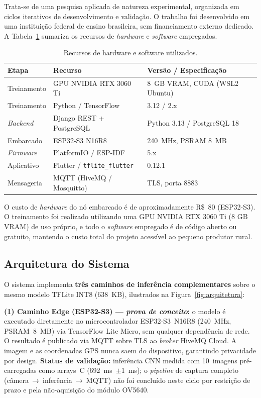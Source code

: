 \documentclass[12pt]{article}
\begin{document}
Trata-se de uma pesquisa aplicada de natureza experimental, organizada em ciclos
iterativos de desenvolvimento e validação. O trabalho foi desenvolvido em uma instituição federal de ensino brasileira, sem financiamento externo dedicado. A Tabela~\ref{tab:recursos}
sumariza os recursos de \textit{hardware} e \textit{software} empregados.

\begin{table}[ht]
\centering
\caption{Recursos de hardware e software utilizados.}
\label{tab:recursos}
\begin{tabular}{@{}lll@{}}
\toprule
\textbf{Etapa} & \textbf{Recurso} & \textbf{Versão / Especificação} \\
\midrule
Treinamento  & GPU NVIDIA RTX 3060 Ti           & 8~GB VRAM, CUDA (WSL2 Ubuntu) \\
Treinamento  & Python / TensorFlow              & 3.12 / 2.x \\
\textit{Backend} & Django REST + PostgreSQL      & Python 3.13 / PostgreSQL 18 \\
Embarcado    & ESP32-S3 N16R8                   & 240~MHz, PSRAM 8~MB \\
\textit{Firmware} & PlatformIO / ESP-IDF         & 5.x \\
Aplicativo   & Flutter / \texttt{tflite\_flutter} & 0.12.1 \\
Mensageria   & MQTT (HiveMQ / Mosquitto)        & TLS, porta 8883 \\
\bottomrule
\end{tabular}
\end{table}

O custo de \textit{hardware} do nó embarcado é de aproximadamente R\$~80 (ESP32-S3).
O treinamento foi realizado utilizando uma GPU NVIDIA RTX 3060 Ti (8 GB VRAM) de uso próprio, e todo o \textit{software}
empregado é de código aberto ou gratuito, mantendo o custo total do projeto acessível
ao pequeno produtor rural.

\subsection{Arquitetura do Sistema}

O sistema implementa \textbf{três caminhos de inferência complementares} sobre o
mesmo modelo TFLite INT8 (638~KB), ilustrados na Figura~\ref{fig:arquitetura}:

\textbf{(1) Caminho Edge (ESP32-S3) — \textit{prova de conceito}:} o modelo é
executado diretamente no microcontrolador ESP32-S3~N16R8 (240~MHz, PSRAM~8~MB)
via TensorFlow Lite Micro, sem qualquer dependência de rede. O resultado é
publicado via MQTT sobre TLS ao \textit{broker} HiveMQ Cloud. A imagem e as
coordenadas GPS nunca saem do dispositivo, garantindo privacidade por design.
\textbf{Status de validação:} inferência CNN medida com 10~imagens pré-carregadas
como arrays~C (692~ms~$\pm$1~ms); o \textit{pipeline} de captura completo
(câmera~→~inferência~→~MQTT) não foi concluído neste ciclo por restrição de
prazo e pela não-aquisição do módulo OV5640.
\end{document}
